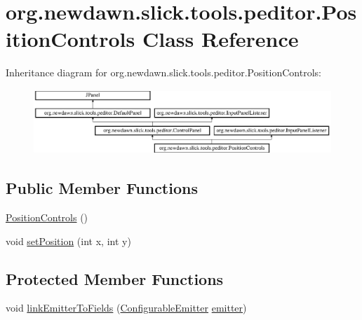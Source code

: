\hypertarget{classorg_1_1newdawn_1_1slick_1_1tools_1_1peditor_1_1_position_controls}{}\section{org.\+newdawn.\+slick.\+tools.\+peditor.\+Position\+Controls Class Reference}
\label{classorg_1_1newdawn_1_1slick_1_1tools_1_1peditor_1_1_position_controls}
Inheritance diagram for org.\+newdawn.\+slick.\+tools.\+peditor.\+Position\+Controls\+:\begin{figure}[H]
\begin{center}
\leavevmode
\includegraphics[height=2.440087cm]{classorg_1_1newdawn_1_1slick_1_1tools_1_1peditor_1_1_position_controls}
\end{center}
\end{figure}
\subsection*{Public Member Functions}
\begin{DoxyCompactItemize}
\item 
\mbox{\hyperlink{classorg_1_1newdawn_1_1slick_1_1tools_1_1peditor_1_1_position_controls_a038f5e0c0fd697f1c3c07587b8f088aa}{Position\+Controls}} ()
\item 
void \mbox{\hyperlink{classorg_1_1newdawn_1_1slick_1_1tools_1_1peditor_1_1_position_controls_ae51ae70abf10cee5baf34d30e4dccdff}{set\+Position}} (int x, int y)
\end{DoxyCompactItemize}
\subsection*{Protected Member Functions}
\begin{DoxyCompactItemize}
\item 
void \mbox{\hyperlink{classorg_1_1newdawn_1_1slick_1_1tools_1_1peditor_1_1_position_controls_a682f1a5893312b3de3ceee398efd9ff6}{link\+Emitter\+To\+Fields}} (\mbox{\hyperlink{classorg_1_1newdawn_1_1slick_1_1particles_1_1_configurable_emitter}{Configurable\+Emitter}} \mbox{\hyperlink{classorg_1_1newdawn_1_1slick_1_1tools_1_1peditor_1_1_control_panel_aaa170169fa574cb6b271f782afcd2517}{emitter}})
\end{DoxyCompactItemize}
